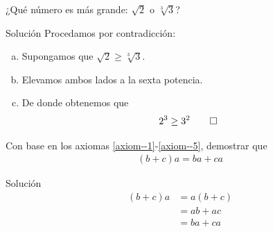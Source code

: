 {}
	\begin{problema}
		¿Qué número es más grande: $\sqrt{2}$ o $ \sqrt[3]{3} $?
	\end{problema}

{Solución}
	Procedamos por contradicción:
	\begin{enumerate}[(a)]
		\item 
		Supongamos que $ \sqrt{2} \geq \sqrt[3]{3}$. 
		\item Elevamos ambos lados a la sexta potencia. 
		\item De donde obtenemos que 
		\begin{align*}
			2^{3} \geq 3^{2} \qed
		\end{align*} 
	\end{enumerate}

{}
	\begin{problema}
		Con base en los axiomas \eqref{axiom--1}-\eqref{axiom--5}, demostrar que
		\begin{align*}
			(b+c)a=ba+ca
		\end{align*}
	\end{problema}

{Solución}
		\begin{align*}
		(b+c)a &= a(b+c)\\ 
		&=ab+ac \\ 
		&=ba+ca
		\end{align*}

